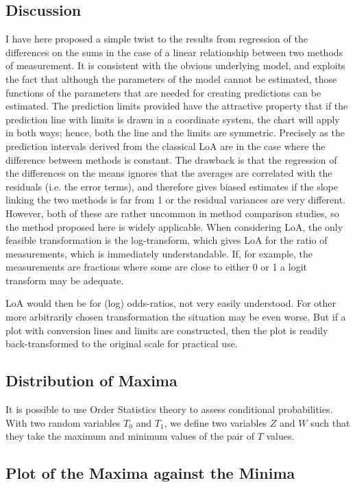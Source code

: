 \documentclass[12pt, a4paper]{report}
\begin{document}
\subsection{Discussion}
I have here proposed a simple twist to the results from regression of the differences on the sums in the case of a linear relationship
between two methods of measurement. It is consistent with the obvious underlying model, and exploits the fact that although
the parameters of the model cannot be estimated, those functions of the parameters that are needed for creating predictions
can be estimated.
The prediction limits provided have the attractive property that if the prediction line with limits is drawn in a coordinate
system, the chart will apply in both ways; hence, both the line and the limits are symmetric. Precisely as the prediction intervals
derived from the classical LoA are in the case where the difference between methods is constant.
The drawback is that the regression of the differences on the means ignores that the averages are correlated with the residuals
(i.e. the error terms), and therefore gives biased estimates if the slope linking the two methods is far from 1 or the residual
variances are very different. However, both of these are rather uncommon in method comparison studies, so the method proposed
here is widely applicable.
When considering LoA, the only feasible transformation is the log-transform, which gives LoA for the ratio of measurements,
which is immediately understandable. If, for example, the measurements are fractions where some are close to either 0 or 1 a
logit transform may be adequate. 

LoA would then be for (log) odds-ratios, not very easily understood. For other more arbitrarily
chosen transformation the situation may be even worse. But if a plot with conversion lines and limits are constructed, then the
plot is readily back-transformed to the original scale for practical use.

\subsection{Distribution of Maxima} It is possible to use Order
Statistics theory to assess conditional probabilities. With two
random variables $T_{0}$ and $T_{1}$, we define two variables $Z$
and $W$ such that they take the maximum and minimum values of the
pair of $T$ values.\subsection{Plot of the Maxima against the
	Minima}
\end{document}
